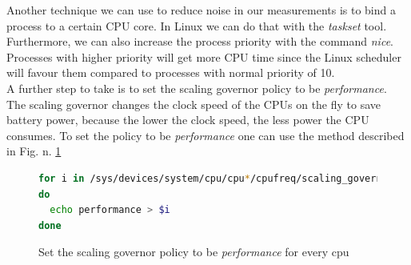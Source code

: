 Another technique we can use to reduce noise in our measurements is  to bind a process to a certain CPU core. In Linux we can do that with the \textit{taskset} tool. \cite{LinuxManualWeb}\\
Furthermore, we can also increase the process priority with the command \textit{nice}. Processes with higher priority will get more CPU time since the Linux scheduler will favour them compared to processes with normal priority of 10. \cite{LinuxManualWeb}\\
A further step to take is to set the scaling governor policy to be \textit{performance}. The scaling governor changes the clock speed of the CPUs on the fly to save battery power, because the lower the clock speed, the less power the CPU consumes. To set the policy to be \textit{performance} one can use the method described in Fig. n. \ref{fig:per_sca}
\begin{figure}[h]
\begin{lstlisting}[language=bash]
for i in /sys/devices/system/cpu/cpu*/cpufreq/scaling_governor
do
  echo performance > $i
done
\end{lstlisting}
\caption{Set the scaling governor policy to be \textit{performance} for every cpu}
\label{fig:per_sca}
\end{figure}



